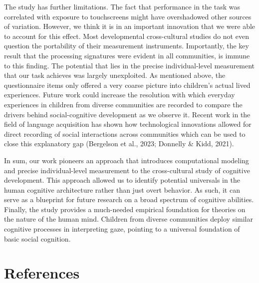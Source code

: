 \documentclass[
  man,floatsintext]{apa7}
\begin{document}
The study has further limitations. The fact that performance in the task was correlated with exposure to touchscreens might have overshadowed other sources of variation. However, we think it is in an important innovation that we were able to account for this effect. Most developmental cross-cultural studies do not even question the portability of their measurement instruments. Importantly, the key result that the processing signatures were evident in all communities, is immune to this finding. The potential that lies in the precise individual-level measurement that our task achieves was largely unexploited. As mentioned above, the questionnaire items only offered a very coarse picture into children's actual lived experiences. Future work could increase the resolution with which everyday experiences in children from diverse communities are recorded to compare the drivers behind social-cognitive development as we observe it. Recent work in the field of language acquisition has shown how technological innovations allowed for direct recording of social interactions across communities which can be used to close this explanatory gap (Bergelson et al., 2023; Donnelly \& Kidd, 2021).

In sum, our work pioneers an approach that introduces computational modeling and precise individual-level measurement to the cross-cultural study of cognitive development. This approach allowed us to identify potential universals in the human cognitive architecture rather than just overt behavior. As such, it can serve as a blueprint for future research on a broad spectrum of cognitive abilities. Finally, the study provides a much-needed empirical foundation for theories on the nature of the human mind. Children from diverse communities deploy similar cognitive processes in interpreting gaze, pointing to a universal foundation of basic social cognition.

\newpage

\hypertarget{references}{%
\section{References}\label{references}}
\end{document}
